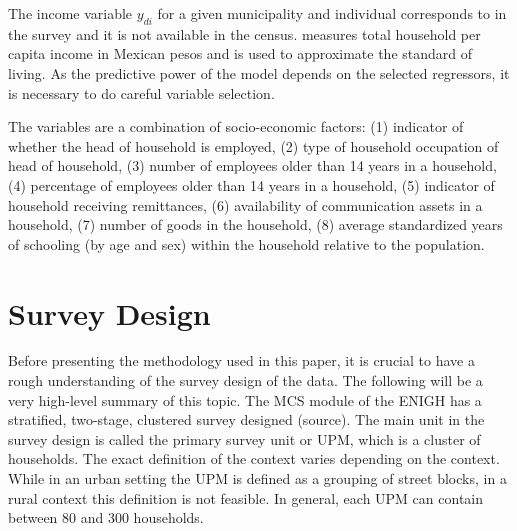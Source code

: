 The income variable $y_{di}$ for a given municipality and individual corresponds to  in the survey and it is not available in the census.
 measures total household per capita income in Mexican pesos and is used to approximate the standard of living.
As the predictive power of the model depends on the selected regressors, it is necessary to do careful variable selection.


The variables are a combination of socio-economic factors: (1) indicator of whether the head of household is employed, (2) type of household occupation of head of household, (3) number of employees older than 14 years in a household, (4) percentage of employees older than 14 years in a household, (5) indicator of household receiving remittances, (6) availability of communication assets in a household, (7) number of goods in the household, (8) average standardized years of schooling (by age and sex) within the household relative to the population.


\section{Survey Design}

Before presenting the methodology used in this paper, it is crucial to have a rough understanding of the survey design of the data.
The following will be a very high-level summary of this topic.
The MCS module of the ENIGH has a stratified, two-stage, clustered survey designed (source).
The main unit in the survey design is called the primary survey unit or UPM, which is a cluster of households.
The exact definition of the context varies depending on the context.
While in an urban setting the UPM is defined as a grouping of street blocks, in a rural context this definition is not feasible.
In general, each UPM can contain between 80 and 300 households.

